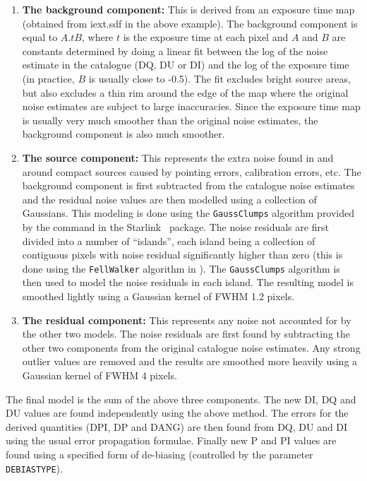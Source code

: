 \begin{enumerate}
\item {\bf The background component:} This is derived from an exposure time map  (obtained from
iext.sdf in the above example). The background component is equal to $A.tB$, where $t$ is 
the exposure time at each pixel and $A$ and $B$ are constants determined by doing a linear fit 
between
the log of the noise estimate in the catalogue (DQ, DU or DI) and the log of the exposure time
(in practice, $B$ is usually close to -0.5). The fit excludes bright source areas, but also excludes a
thin rim around the edge of the map where the original noise estimates are subject to large
inaccuracies. Since the exposure time map is usually very much smoother than the original
noise estimates, the background component is also much smoother.
\item {\bf The source component:} This represents the extra noise found in and around compact sources caused by pointing errors, calibration errors, etc. The background component is first subtracted from the catalogue noise estimates and the residual noise values are then modelled using a collection of Gaussians. This modeling is done using the \texttt{GaussClumps} algorithm provided by the  command in the Starlink \cupid\ package. The noise residuals are first divided into a number of ``islands'', each island being a collection of contiguous pixels with  noise residual significantly higher than zero (this is done using the \texttt{FellWalker} algorithm in \cupid). The \texttt{GaussClumps} algorithm is then used to model the noise residuals in each island. The resulting model is smoothed lightly using a Gaussian kernel of FWHM 1.2 pixels.
\item {\bf The residual component:} This represents any noise not accounted for by the other two models. The noise residuals are first found by subtracting the other two components from the original catalogue noise estimates. Any strong outlier values are removed and the results are smoothed more heavily using a Gaussian kernel of FWHM 4 pixels.
\end{enumerate}

The final model is the sum of the above three components. The new DI, DQ and DU values are found independently using the above method. The errors for the derived quantities (DPI, DP and DANG) are then found from DQ, DU and DI using the usual error propagation formulae. Finally new P and PI values are found using a specified form of de-biasing (controlled by the parameter \texttt{DEBIASTYPE}).


